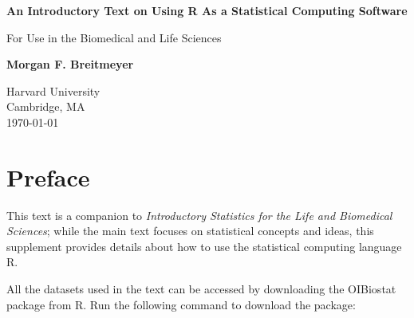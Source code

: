 \documentclass{report}\usepackage[]{graphicx}\usepackage[]{color}
\begin{document}
\minitoc

\begin{titlepage}
    \begin{center}
        \vspace*{1cm}
        
        \textbf{An Introductory Text on Using R As a Statistical Computing Software}
        
        \vspace{0.5cm}
        For Use in the Biomedical and Life Sciences 
        
        \vspace{1.5cm}
        
        \textbf{Morgan F. Breitmeyer}
        
        \vfill
        
        
        \vspace{0.8cm}
        
        
        Harvard University\\
        Cambridge, MA\\
        \today
        
    \end{center}
\end{titlepage}


\setcounter{tocdepth}{1}
\dominitoc
\tableofcontents

\newpage 
\setcounter{chapter}{-1}
\chapter{Preface}
\minitoc

\pagestyle{fancy}

This text is a companion to \textit{Introductory Statistics for the Life and Biomedical Sciences}; while the main text focuses on statistical concepts and ideas, this supplement provides details about how to use the statistical computing language \textsf{R}.

All the datasets used in the text can be accessed by downloading the OIBiostat package from \textsf{R}. Run the following command to download the package:
\end{document}
